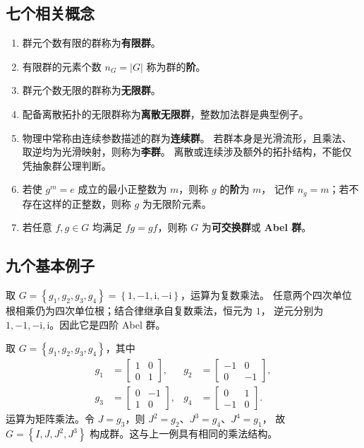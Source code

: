 \subsection{七个相关概念}
\begin{enumerate}
\item 群元个数有限的群称为\textbf{有限群}。
\item 有限群的元素个数 $n_G=|G|$ 称为群的\textbf{阶}。
\item 群元个数无限的群称为\textbf{无限群}。
\item 配备离散拓扑的无限群称为\textbf{离散无限群}，整数加法群是典型例子。
\item 物理中常称由连续参数描述的群为\textbf{连续群}。
若群本身是光滑流形，且乘法、取逆均为光滑映射，则称为\textbf{李群}。
离散或连续涉及额外的拓扑结构，不能仅凭抽象群公理判断。
\item 若使 $g^m=e$ 成立的最小正整数为 $m$，则称 $g$ 的\textbf{阶}为 $m$，
记作 $n_g=m$；若不存在这样的正整数，则称 $g$ 为无限阶元素。
\item 若任意 $f,g\in G$ 均满足 $fg=gf$，则称 $G$ 为\textbf{可交换群}或 \textbf{Abel 群}。
\end{enumerate}

\subsection{九个基本例子}
\begin{example}[四次单位根群]
取 $G=\left\{g_1,g_2,g_3,g_4\right\}=\left\{1,-1,\mathrm{i},-\mathrm{i}\right\}$，运算为复数乘法。
任意两个四次单位根相乘仍为四次单位根；结合律继承自复数乘法，恒元为 $1$，
逆元分别为 $1,-1,-\mathrm{i},\mathrm{i}$。因此它是四阶 Abel 群。
\end{example}

\begin{example}[四阶矩阵群]
取 $G=\left\{g_1,g_2,g_3,g_4\right\}$，其中
\begin{align}
g_1&=\begin{bmatrix}1&0\\0&1\end{bmatrix},&
g_2&=\begin{bmatrix}-1&0\\0&-1\end{bmatrix},\\
g_3&=\begin{bmatrix}0&-1\\1&0\end{bmatrix},&
g_4&=\begin{bmatrix}0&1\\-1&0\end{bmatrix}.
\end{align}
运算为矩阵乘法。令 $J=g_3$，则 $J^2=g_2$、$J^3=g_4$、$J^4=g_1$，
故 $G=\left\{I,J,J^2,J^3\right\}$ 构成群。这与上一例具有相同的乘法结构。
\end{example}

